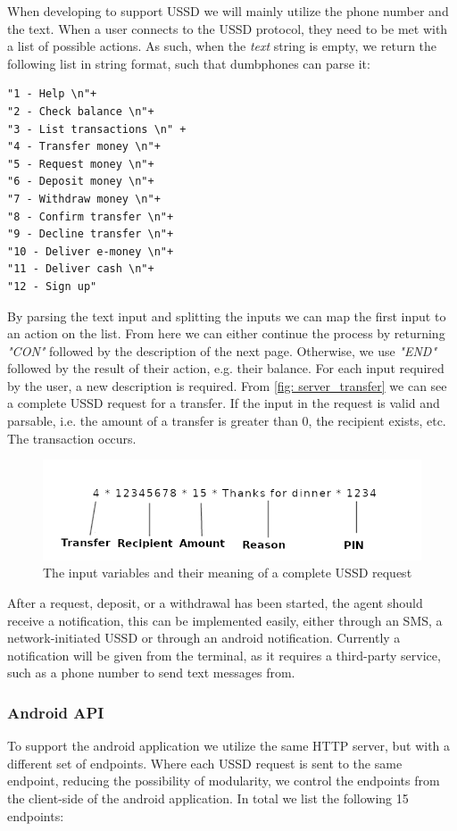 \documentclass[11pt, a4paper]{article}
\begin{document}
When developing to support USSD we will mainly utilize the phone number and the text. When a user connects to the USSD protocol, they need to be met with a list of possible actions. As such, when the \textit{text} string is empty, we return the following list in string format, such that dumbphones can parse it:
\begin{lstlisting}
"1 - Help \n"+
"2 - Check balance \n"+
"3 - List transactions \n" +
"4 - Transfer money \n"+
"5 - Request money \n"+
"6 - Deposit money \n"+
"7 - Withdraw money \n"+
"8 - Confirm transfer \n"+
"9 - Decline transfer \n"+
"10 - Deliver e-money \n"+
"11 - Deliver cash \n"+
"12 - Sign up"
\end{lstlisting}

By parsing the text input and splitting the inputs we can map the first input to an action on the list. From here we can either continue the process by returning \textit{"CON"} followed by the description of the next page. Otherwise, we use \textit{"END"} followed by the result of their action, e.g. their balance. For each input required by the user, a new description is required. From \autoref{fig: server_transfer} we can see a complete USSD request for a transfer. If the input in the request is valid and parsable, i.e. the amount of a transfer is greater than 0, the recipient exists, etc. The transaction occurs.

\begin{figure}[ht]
\centering
\includegraphics[width=1\linewidth]{figs/transfer_desc.png}
\caption{The input variables and their meaning of a complete USSD request}
\label{fig: server_transfer}
\end{figure}

After a request, deposit, or a withdrawal has been started, the agent should receive a notification, this can be implemented easily, either through an SMS, a network-initiated USSD or through an android notification. Currently a notification will be given from the terminal, as it requires a third-party service, such as a phone number to send text messages from.



\subsubsection{Android API}
To support the android application we utilize the same HTTP server, but with a different set of endpoints. Where each USSD request is sent to the same endpoint, reducing the possibility of modularity, we control the endpoints from the client-side of the android application. In total we list the following 15 endpoints:
\end{document}
